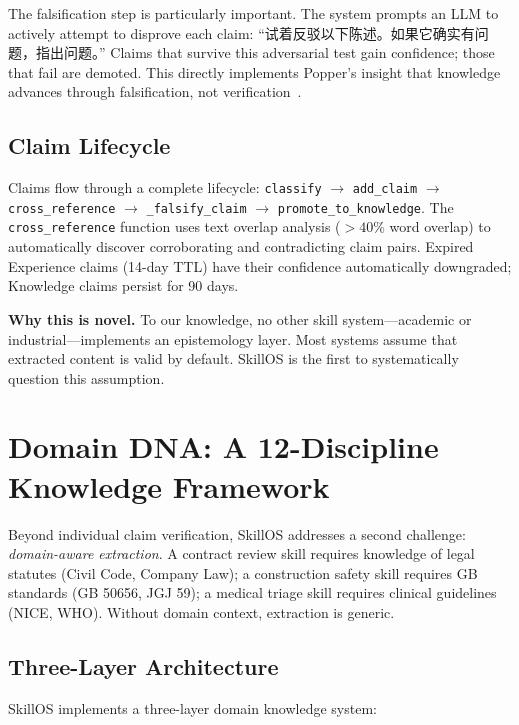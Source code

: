 \documentclass[11pt]{article}
\begin{document}
The falsification step is particularly important. The system prompts an LLM to actively attempt to disprove each claim: ``试着反驳以下陈述。如果它确实有问题，指出问题。'' Claims that survive this adversarial test gain confidence; those that fail are demoted. This directly implements Popper's insight that knowledge advances through falsification, not verification~\cite{popper}.

\subsection{Claim Lifecycle}

Claims flow through a complete lifecycle: \texttt{classify} $\rightarrow$ \texttt{add\_claim} $\rightarrow$ \texttt{cross\_reference} $\rightarrow$ \texttt{\_falsify\_claim} $\rightarrow$ \texttt{promote\_to\_knowledge}. The \texttt{cross\_reference} function uses text overlap analysis ($>40\%$ word overlap) to automatically discover corroborating and contradicting claim pairs. Expired Experience claims (14-day TTL) have their confidence automatically downgraded; Knowledge claims persist for 90 days.

\textbf{Why this is novel.} To our knowledge, no other skill system---academic or industrial---implements an epistemology layer. Most systems assume that extracted content is valid by default. SkillOS is the first to systematically question this assumption.

\section{Domain DNA: A 12-Discipline Knowledge Framework}
\label{sec:domain-dna}

Beyond individual claim verification, SkillOS addresses a second challenge: \textit{domain-aware extraction}. A contract review skill requires knowledge of legal statutes (Civil Code, Company Law); a construction safety skill requires GB standards (GB 50656, JGJ 59); a medical triage skill requires clinical guidelines (NICE, WHO). Without domain context, extraction is generic.

\subsection{Three-Layer Architecture}

SkillOS implements a three-layer domain knowledge system:
\end{document}
